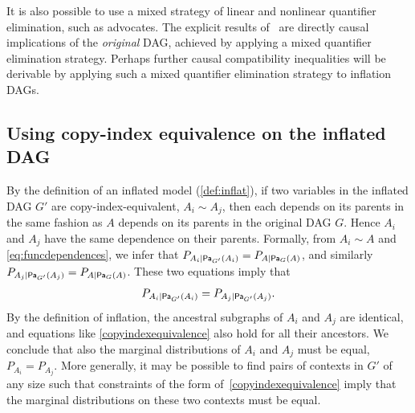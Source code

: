 \documentclass[aps,english,superscriptaddress,onecolumn,twoside,longbibliography,pra,floatfix,fleqn,nofootinbib]{revtex4-1}%
\theoremstyle{definition}
\newcommand{\pfunc}[1]{P_{#1}}
\newcommand{\Pa}[2][]{{\mathsf{Pa}_{#1}}\parenths{#2}}
\DeclarePairedDelimiter{\parenths}{\lparen}{\rparen}
\begin{document}
It is also possible to use a mixed strategy of linear and nonlinear quantifier elimination, such as \citet{ChavesPolynomial} advocates. The explicit results of~\cite{ChavesPolynomial} are directly causal implications of the \emph{original} DAG, achieved by applying a mixed quantifier elimination strategy. Perhaps further causal compatibility inequalities will be derivable by applying such a mixed quantifier elimination strategy to inflation DAGs.

\subsection{Using copy-index equivalence on the inflated DAG}\label{Sec:copyindexequivalence}

By the definition of an inflated model (\cref{def:inflat}), if two variables in the inflated DAG $G'$ are copy-index-equivalent, $A_i \sim A_j$, then each depends on its parents in the same fashion as $A$ depends on its parents in the original DAG $G$. Hence $A_i$ and $A_j$ have the same dependence on their parents.  Formally, from $A_i \sim A$ and \cref{eq:funcdependences}, we infer that $\pfunc{A_i| \Pa[G']{A_i}}=\pfunc{A|\Pa[G]{A}}$, and similarly $\pfunc{A_j| \Pa[G']{A_j}}=\pfunc{A|\Pa[G]{A}}$.  These two equations imply that 
\begin{align}\label{copyindexequivalence}
\pfunc{A_i| \Pa[G']{A_i}}=\pfunc{A_j|\Pa[G']{A_j}}.
 \end{align}
By the definition of inflation, the ancestral subgraphs of $A_i$ and $A_j$ are identical, and equations like \cref{copyindexequivalence} also hold for all their ancestors. We conclude that also the marginal distributions of $A_i$ and $A_j$ must be equal, $\pfunc{A_i}=\pfunc{A_j}$.
More generally, it may be possible to find pairs of contexts in $G'$ of any size such that constraints of the form of~\cref{copyindexequivalence} imply that the marginal distributions on these two contexts must be equal. 
\end{document}
